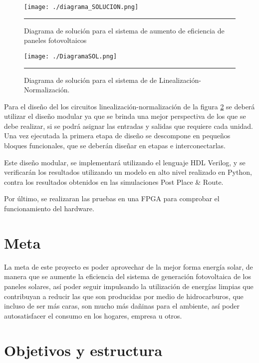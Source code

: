 \begin{figure}[H]
  \centering
    \texttt{[image: ./diagrama\_SOLUCION.png]}
    \rule{35em}{0.5pt}
  \caption[Diagrama de solución para el sistema de aumento de eficiencia de paneles fotovoltaicos]{ Diagrama de solución para el sistema de aumento de eficiencia de paneles fotovoltaicos}
  \label{fig:DSOL}
\end{figure}

\begin{figure}[H]
  \centering
    \texttt{[image: ./DiagramaSOL.png]}
    \rule{35em}{0.5pt}
  \caption[Diagrama de solución para el sistema de Linealización-Normalización.]{ Diagrama de solución para el sistema de de Linealización-Normalización.}
  \label{fig:DiagramaSOL}
\end{figure}

Para el diseño del los circuitos linealización-normalización de la figura \ref{fig:DiagramaSOL} se deberá utilizar el diseño modular ya que se brinda una mejor perspectiva de los que se debe realizar, si se podrá asignar las entradas y salidas que requiere cada unidad. Una vez ejecutada la primera etapa de diseño se descompone en pequeños bloques funcionales, que se deberán diseñar en etapas e interconectarlas.   

Este diseño modular, se implementará utilizando el lenguaje HDL Verilog, y se verificarán los resultados utilizando un modelo en alto nivel realizado en Python, contra los resultados obtenidos en las simulaciones Post Place \& Route.

Por último, se realizaran las pruebas en una FPGA para comprobar el funcionamiento del hardware. 

\section{Meta}

La meta de este proyecto es poder aprovechar de la mejor forma energía solar, de manera que se aumente la eficiencia del sistema de generación fotovoltaica de los paneles solares, así poder seguir impulsando la utilización de energías limpias que contribuyan a reducir las que son producidas por medio de hidrocarburos, que incluso de ser más caras, son mucho más dañinas para el ambiente, así poder autosatisfacer el consumo en los hogares, empresa u otros. 

\section{Objetivos y estructura}

